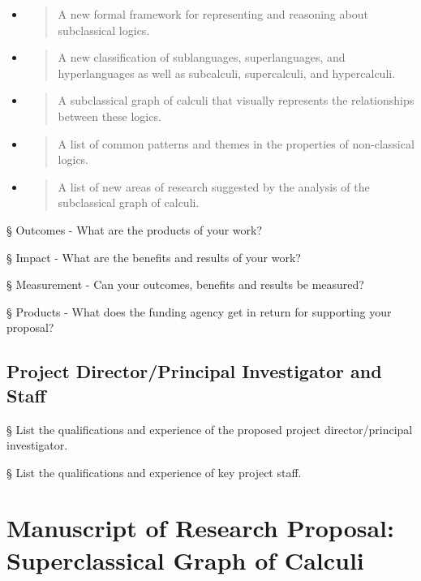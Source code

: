 \begin{itemize}
\item
  \begin{quote}
  A new formal framework for representing and reasoning about
  subclassical logics.
  \end{quote}
\item
  \begin{quote}
  A new classification of sublanguages, superlanguages, and
  hyperlanguages as well as subcalculi, supercalculi, and hypercalculi.
  \end{quote}
\item
  \begin{quote}
  A subclassical graph of calculi that visually represents the
  relationships between these logics.
  \end{quote}
\item
  \begin{quote}
  A list of common patterns and themes in the properties of
  non-classical logics.
  \end{quote}
\item
  \begin{quote}
  A list of new areas of research suggested by the analysis of the
  subclassical graph of calculi.
  \end{quote}
\end{itemize}

§ Outcomes - What are the products of your work?

§ Impact - What are the benefits and results of your work?

§ Measurement - Can your outcomes, benefits and results be measured?

§ Products - What does the funding agency get in return for supporting
your proposal?

\hypertarget{project-directorprincipal-investigator-and-staff}{%
\subsection{Project Director/Principal Investigator and
Staff}\label{project-directorprincipal-investigator-and-staff}}

§ List the qualifications and experience of the proposed project
director/principal investigator.

§ List the qualifications and experience of key project staff.

\hypertarget{manuscript-of-research-proposal-superclassical-graph-of-calculi}{%
\section{Manuscript of Research Proposal: Superclassical Graph of
Calculi}\label{manuscript-of-research-proposal-superclassical-graph-of-calculi}}

